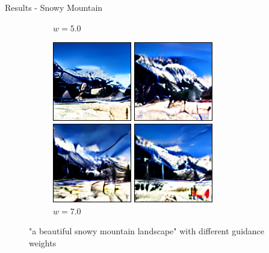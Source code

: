 \documentclass[11pt]{beamer}
\begin{document}
\begin{frame}{Results - Snowy Mountain}
\begin{figure}
\begin{subfigure}[b]{0.24\textwidth}
        \caption{$w=5.0$}
      \end{subfigure}
      \begin{subfigure}[b]{0.24\textwidth}
        \includegraphics[width=\linewidth]{figures/a_beautiful_snowy_mountain_landscape_7.png}
        \caption{$w=7.0$}
      \end{subfigure}
      \caption{"a beautiful snowy mountain landscape" with different guidance weights}
    \end{figure}
  \end{frame}
\end{document}
